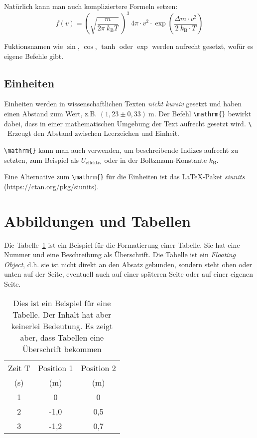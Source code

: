 \documentclass[11pt,a4paper]{article}
\begin{document}
Natürlich kann man auch kompliziertere Formeln setzen:
\begin{equation}
   f(v) = \left( \sqrt{\frac{m}{2\pi\ k_\mathrm{B}T}}\ \right)^3\ 4\pi\cdot v^2 \cdot \exp\left( \frac{\Delta m\cdot v^2}{2\ k_\mathrm{B}\cdot T}\right) 
\end{equation}

Fuktionsnamen wie $\sin{}$, $\cos{}$, $\tanh{}$ oder $\exp{}$ werden aufrecht gesetzt, wofür es eigene Befehle gibt.

\subsection{Einheiten}
Einheiten werden in wissenschaftlichen Texten \emph{nicht kursiv} gesetzt und haben einen Abstand zum Wert, z.B. $(1,23\pm 0,33)\ \mathrm{m}$. Der Befehl \verb!\mathrm{}! bewirkt dabei, dass in einer mathematischen Umgebung der Text aufrecht gesetzt wird. \glqq\verb!\ !\grqq\ Erzeugt den Abstand zwischen Leerzeichen und Einheit. 

\verb!\mathrm{}! kann man auch verwenden, um beschreibende Indizes aufrecht zu setzten, zum Beispiel als $U_\mathrm{effektiv}$ oder in der Boltzmann-Konstante $k_\mathrm{B}$.

Eine Alternative zum \verb!\mathrm{}! für die Einheiten ist das \LaTeX-Paket \emph{siunits} (https://ctan.org/pkg/siunits).

\section{Abbildungen und Tabellen}
Die Tabelle~\ref{tab:sinnlosetabelle} ist ein Beispiel für die Formatierung einer Tabelle. Sie hat eine Nummer und eine Beschreibung als Überschrift. Die Tabelle ist ein \emph{Floating Object}, d.h. sie ist nicht direkt an den Absatz gebunden, sondern steht oben oder unten auf der Seite, eventuell auch auf einer späteren Seite oder auf einer eigenen Seite.
\begin{table}[tb] %
    \centering
    \caption{Dies ist ein Beispiel für eine Tabelle. Der Inhalt hat aber keinerlei Bedeutung. Es zeigt aber, dass Tabellen eine Überschrift bekommen}
    \begin{tabular}{c|c|c}
        Zeit T & Position 1 & Position 2 \\
         (s)   &   (m)      & (m)        \\ 
         \hline
          1    &   0        & 0 \\
          2    &   -1,0       & 0,5 \\
          3    &   -1,2       & 0,7
        \end{tabular}
    \label{tab:sinnlosetabelle}
\end{table}
\end{document}

